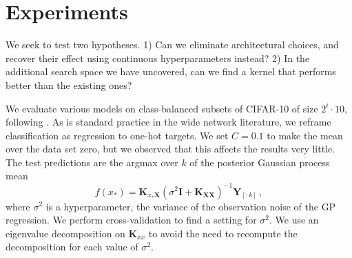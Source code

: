 \documentclass[tablecaption=bottom,wcp,nonatbib]{jmlr} %
\newcommand{\vX}{\mathbf{X}}
\newcommand{\vQ}{\mathbf{Q}}
\newcommand{\vK}{\mathbf{K}}
\newcommand{\vY}{\mathbf{Y}}
\newcommand{\vLambda}{\boldsymbol{\Lambda}}
\newcommand{\eye}{\mathbf{I}}
\newcommand{\tp}{{\mathrm{\textsf{\tiny T}}}}
\newcommand{\bracket}[3]{{\left#1 #3 \right#2}}
\newcommand{\bra}{\bracket{(}{)}}
\newcommand{\indicator}[1]{{\mathds{1}}\left[#1\right]}
\begin{document}
\section{Experiments}
We seek to test two hypotheses. 1) Can we eliminate architectural choices, and
recover their effect using continuous hyperparameters instead? 
2) In the additional search space we have uncovered, can we find a kernel that
performs better than the existing ones?

We evaluate various models on class-balanced subsets of CIFAR-10 of size $2^i \cdot 10$, following \citet{arora2020small}. As is
standard practice in the wide network literature, we reframe classification as
regression to one-hot targets. %
We set $C=0.1$ to make the mean over the data set zero, but we observed that this affects the results very little. The test
predictions are the argmax over $k$ of the posterior Gaussian process mean
\begin{equation}f(x_*) = \vK_{x_* \vX}\bra{\sigma^2\eye + \vK_{\vX\vX}}^{-1}\vY_{[:k]}\,, \label{eq:mean-gp}\end{equation} where
$\sigma^2$ is a hyperparameter, the variance of the observation noise of the GP regression. We perform cross-validation to find a setting for $\sigma^2$. We use an eigenvalue decomposition on $\vK_{xx}$ to avoid the need to recompute the decomposition for each value of $\sigma^2$.

\end{document}
